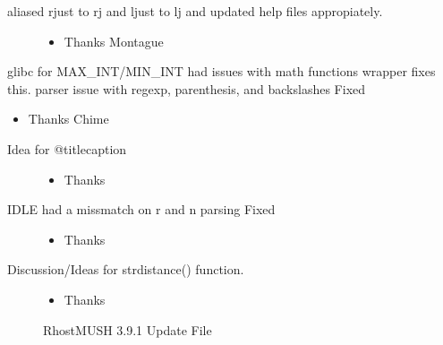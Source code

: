 \documentclass[letterpaper,10pt,english]{sphinxmanual}
\begin{document}
\begin{description}
\begin{itemize}
\end{itemize}

\item[{aliased rjust to rj and ljust to lj and updated help files appropiately.}] \leavevmode\begin{itemize}
\item {} 
\sphinxAtStartPar
Thanks Montague

\end{itemize}

\end{description}

\sphinxAtStartPar
glibc for MAX\_INT/MIN\_INT had issues with math functions \sphinxhyphen{} wrapper fixes this.
parser issue with regexp, parenthesis, and backslashes \textendash{} Fixed
\begin{itemize}
\item {} 
\sphinxAtStartPar
Thanks Chime

\end{itemize}
\begin{description}
\item[{Idea for @titlecaption}] \leavevmode\begin{itemize}
\item {} 
\sphinxAtStartPar
Thanks 

\end{itemize}

\item[{IDLE had a missmatch on r and n parsing \textendash{} Fixed}] \leavevmode\begin{itemize}
\item {} 
\sphinxAtStartPar
Thanks 

\end{itemize}

\item[{Discussion/Ideas for strdistance() function.}] \leavevmode\begin{itemize}
\item {} 
\sphinxAtStartPar
Thanks 

\end{itemize}

\sphinxAtStartPar
RhostMUSH 3.9.1 Update File

\end{description}
\end{document}
